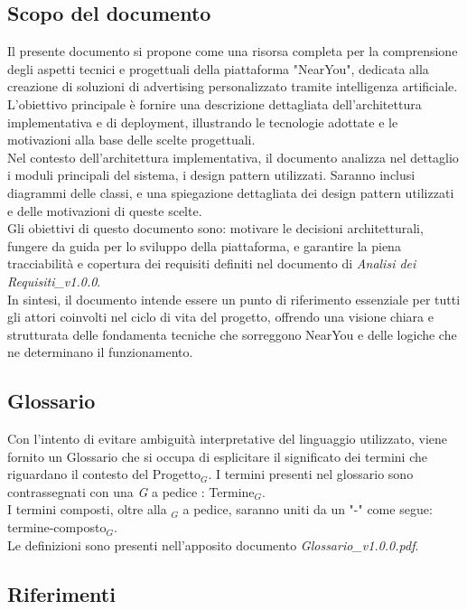 \documentclass[10pt]{article}
\begin{document}
\subsection{Scopo del documento}
Il presente documento si propone come una risorsa completa per la comprensione degli aspetti tecnici e progettuali della piattaforma "NearYou", dedicata alla
creazione di soluzioni di advertising personalizzato tramite intelligenza artificiale. L’obiettivo principale è fornire una descrizione dettagliata dell’architettura
implementativa e di deployment, illustrando le tecnologie adottate e le motivazioni alla base delle scelte progettuali.\\
Nel contesto dell'architettura implementativa, il documento analizza nel dettaglio i moduli principali del sistema, i design pattern utilizzati. Saranno inclusi
diagrammi delle classi, e una spiegazione dettagliata dei design pattern utilizzati e delle motivazioni di queste scelte.\\
Gli obiettivi di questo documento sono: motivare le decisioni architetturali, fungere da guida per lo sviluppo della piattaforma, e garantire la piena tracciabilità e
copertura dei requisiti definiti nel documento di \textit{Analisi dei Requisiti\_v1.0.0}.\\
In sintesi, il documento intende essere un punto di riferimento essenziale per tutti gli attori coinvolti nel ciclo di vita del progetto, offrendo una visione chiara e
strutturata delle fondamenta tecniche che sorreggono NearYou e delle logiche che ne determinano il funzionamento.\\

\subsection{Glossario}
Con l'intento di evitare ambiguità interpretative del linguaggio utilizzato, viene fornito un Glossario che si occupa di esplicitare il significato dei termini che riguardano il contesto del Progetto$_G$. I termini presenti nel glossario sono contrassegnati con una \textit{G} a pedice : Termine$_G$.\\
I termini composti, oltre alla $_G$ a pedice, saranno uniti da un "-" come segue: termine-composto$_G$.\\
Le definizioni sono presenti nell'apposito documento \textit{Glossario\_v1.0.0.pdf}.

\subsection{Riferimenti}
\end{document}
